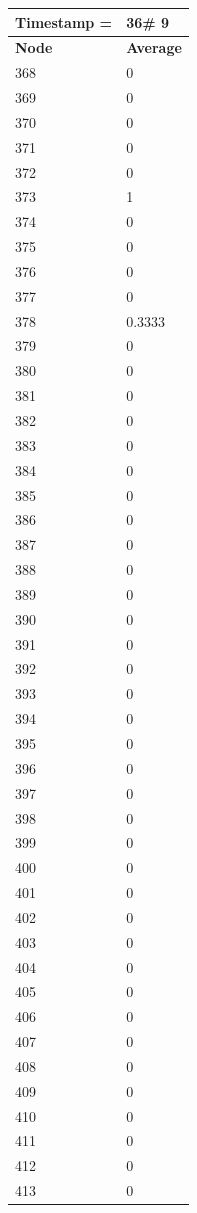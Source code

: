 \begin{tabular}{|l||l|}
\hline
\textbf{Timestamp =} & \textbf{36}\# 9\\\hline
	\textbf{Node} & \textbf{Average} \\ \hline
\hline
	368 & 0 \\ \hline
	369 & 0 \\ \hline
	370 & 0 \\ \hline
	371 & 0 \\ \hline
	372 & 0 \\ \hline
	373 & 1 \\ \hline
	374 & 0 \\ \hline
	375 & 0 \\ \hline
	376 & 0 \\ \hline
	377 & 0 \\ \hline
	378 & 0.3333 \\ \hline
	379 & 0 \\ \hline
	380 & 0 \\ \hline
	381 & 0 \\ \hline
	382 & 0 \\ \hline
	383 & 0 \\ \hline
	384 & 0 \\ \hline
	385 & 0 \\ \hline
	386 & 0 \\ \hline
	387 & 0 \\ \hline
	388 & 0 \\ \hline
	389 & 0 \\ \hline
	390 & 0 \\ \hline
	391 & 0 \\ \hline
	392 & 0 \\ \hline
	393 & 0 \\ \hline
	394 & 0 \\ \hline
	395 & 0 \\ \hline
	396 & 0 \\ \hline
	397 & 0 \\ \hline
	398 & 0 \\ \hline
	399 & 0 \\ \hline
	400 & 0 \\ \hline
	401 & 0 \\ \hline
	402 & 0 \\ \hline
	403 & 0 \\ \hline
	404 & 0 \\ \hline
	405 & 0 \\ \hline
	406 & 0 \\ \hline
	407 & 0 \\ \hline
	408 & 0 \\ \hline
	409 & 0 \\ \hline
	410 & 0 \\ \hline
	411 & 0 \\ \hline
	412 & 0 \\ \hline
	413 & 0 \\ \hline
\end{tabular}

